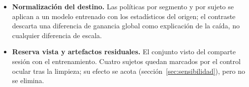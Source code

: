 \begin{itemize}
        dentro de ese conjunto. La ausencia de WBCIC-SHU en el preentrenamiento de LaBraM se comprobó solo
        frente a las fuentes declaradas por sus autores.
  \item \textbf{Normalización del destino.} Las políticas por segmento y por sujeto se aplican a un modelo
        entrenado con los estadísticos del origen; el contraste descarta una diferencia de ganancia global
        como explicación de la caída, no cualquier diferencia de escala.
  \item \textbf{Reserva vista y artefactos residuales.} El conjunto visto del \dsi{} comparte sesión con el
        entrenamiento. Cuatro sujetos quedan marcados por el control ocular tras la limpieza; su efecto se
        acota (sección~\ref{sec:sensibilidad}), pero no se elimina.
\end{itemize}

